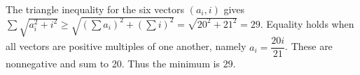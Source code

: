 The triangle inequality for the six vectors $(a_i,i)$ gives $\sum\sqrt{a_i^2+i^2}\ge\sqrt{(\sum a_i)^2+(\sum i)^2}=\sqrt{20^2+21^2}=29 $. Equality holds when all vectors are positive multiples of one another, namely $ a_i=\dfrac{20i}{21}$. These are nonnegative and sum to 20. Thus the minimum is $\boxed{29}$.
